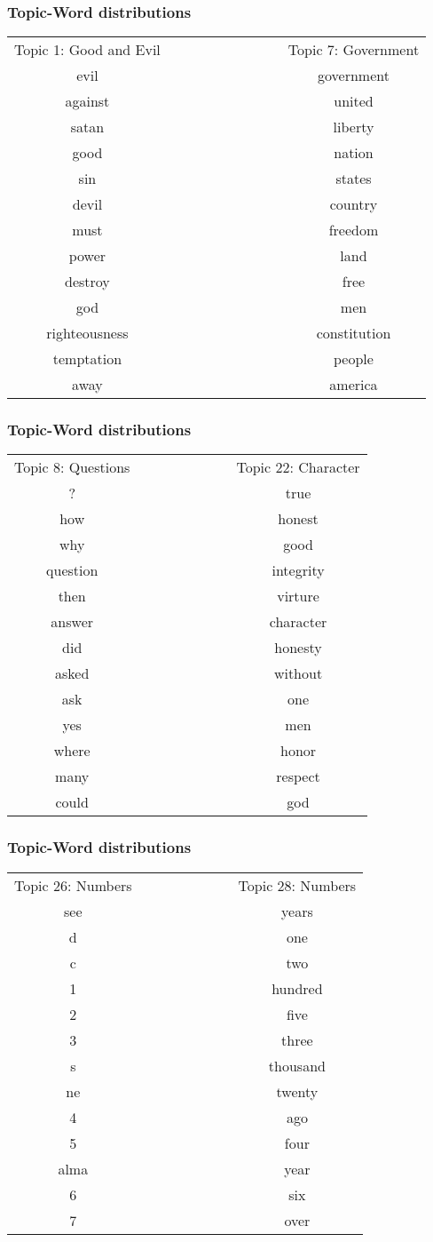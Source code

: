 \documentclass{beamer}
\begin{document}
\begin{frame}
  \frametitle{Topic-Word distributions}
  \begin{tabular}{|c|c|c|}
	Topic 1: Good and Evil &\ \ \ \ \ \ \ \ \ \ \ \ \ \ &Topic 7: Government \\
	evil&&government \\
	against&&united \\
	satan&&liberty \\
	good&&nation \\
	sin&&states \\
	devil&&country \\
	must&&freedom \\
	power&&land \\
	destroy&&free \\
	god&&men \\
	righteousness&&constitution \\
	temptation&&people \\
	away&&america \\
  \end{tabular}
\end{frame}
\begin{frame}
  \frametitle{Topic-Word distributions}
  \begin{tabular}{|c|c|c|}
	Topic 8: Questions &\ \ \ \ \ \ \ \ \ \ \ &Topic 22: Character \\
	?&&true \\
	how&&honest \\
	why&&good \\
	question&&integrity \\
	then&&virture \\
	answer&&character \\
	did&&honesty \\
	asked&&without \\
	ask&&one \\
	yes&&men \\
	where&&honor \\
	many&&respect \\
	could&&god \\
  \end{tabular}
\end{frame}
\begin{frame}
  \frametitle{Topic-Word distributions}
  \begin{tabular}{|c|c|c|}
	Topic 26: Numbers &\ \ \ \ \ \ \ \ \ \ \ &Topic 28: Numbers \\
	see&&years \\
	d&&one \\
	c&&two \\
	1&&hundred \\
	2&&five \\
	3&&three \\
	s&&thousand \\
	ne&&twenty \\
	4&&ago \\
	5&&four \\
	alma&&year \\
	6&&six \\
	7&&over \\
  \end{tabular}
\end{frame}
\end{document}
